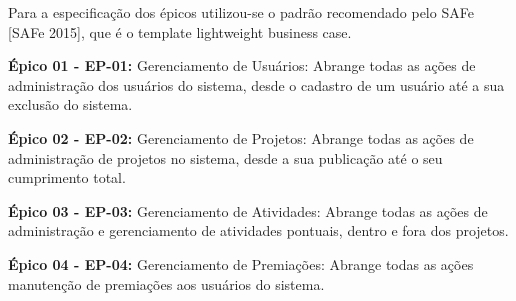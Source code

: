 Para a especificação dos épicos utilizou-se o padrão recomendado pelo SAFe [SAFe 2015], que é o template  lightweight business case.

\textbf{Épico 01 - EP-01:} Gerenciamento de Usuários: Abrange todas as ações de administração dos usuários do sistema, desde o cadastro de um usuário até a sua exclusão do sistema.

\textbf{Épico 02 - EP-02:} Gerenciamento de Projetos: Abrange todas as ações de administração de projetos no sistema, desde a sua publicação até o seu cumprimento total.

\textbf{Épico 03 - EP-03:} Gerenciamento de Atividades: Abrange todas as ações de administração e gerenciamento de atividades pontuais, dentro e fora dos projetos.

\textbf{Épico 04 - EP-04:} Gerenciamento de Premiações: Abrange todas as ações manutenção de premiações aos usuários do sistema.

